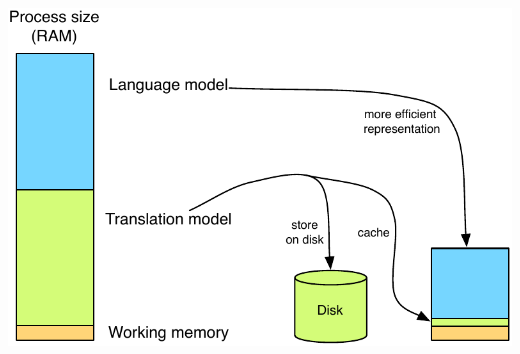 \documentclass[landscape]{uedslides2C}
\begin{document}
\begin{center} 
\includegraphics[scale=1.4]{less-memory.pdf}
\end{center}

\end{document}
